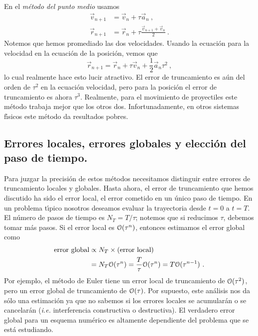 En el {\em m{\'e}todo del punto medio} usamos
\begin{align}
\label{c10-e2.22}
\vec v_{n+1}  &= \vec v_n + \tau \vec a_n\ ,\\
\label{c10-e2.23}
\vec r_{n+1}  &= \vec r_n + \tau \frac{\vec v_{n+1}+\vec v_n}2\ .
\end{align}
Notemos que hemos promediado las dos velocidades. Usando la ecuaci{\'o}n
para la velocidad en la ecuaci{\'o}n de la posici{\'o}n, vemos que
\begin{equation}
\label{c10-e2.24}
\vec r_{n+1} = \vec r_n + \tau \vec v_n + \frac 12  \vec a_n \tau^2\ ,
\end{equation}
lo cual realmente hace esto lucir atractivo. El error de truncamiento
es a{\'u}n del orden de $\tau^2$ en la ecuaci{\'o}n velocidad, pero para la
posici{\'o}n el error de truncamiento es ahora $\tau^3$. Realmente, para el
movimiento de proyectiles este m{\'e}todo trabaja mejor que los otros dos.
Infortunadamente, en otros sistemas f{\'\i}sicos este m{\'e}todo da resultados
pobres.

\subsection{Errores locales, errores globales y elecci{\'o}n del paso de
  tiempo.}

Para juzgar la precisi{\'o}n de estos m{\'e}todos necesitamos distinguir entre
errores de truncamiento locales y globales. Hasta ahora, el error de
truncamiento que hemos discutido ha sido el error local, el error
cometido en un {\'u}nico paso de tiempo. En un problema t{\'\i}pico nosotros
deseamos evaluar la trayectoria desde $t=0$ a $t=T$. El n{\'u}mero de
pasos de tiempo es $N_T=T/\tau$; notemos que si reducimos $\tau$, debemos
tomar m{\'a}s pasos. Si el error local es $\EuScript{O}(\tau^n)$, entonces
estimamos el error global como
\begin{equation}
\label{c10-e2.25}
\begin{split}
\text{error global}&\propto N_T \times (\text{error local})\\
&=N_T\EuScript{O}(\tau^n)=\frac
{T}{\tau}\EuScript{O}(\tau^n)=T\EuScript{O}(\tau^{n-1})\ .
\end{split}
\end{equation}
Por ejemplo, el m{\'e}todo de Euler tiene un error local de truncamiento
de $\EuScript{O}(\tau^2)$, pero un error global de truncamiento de
$\EuScript{O}(\tau)$. Por supuesto, este an{\'a}lisis nos da s{\'o}lo una
estimaci{\'o}n ya que no sabemos si los errores locales se acumular{\'a}n o se
cancelar{\'a}n ({\it i.e.} interferencia constructiva o destructiva). El
verdadero error global para un esquema num{\'e}rico es altamente
dependiente del problema que se est{\'a} estudiando.

